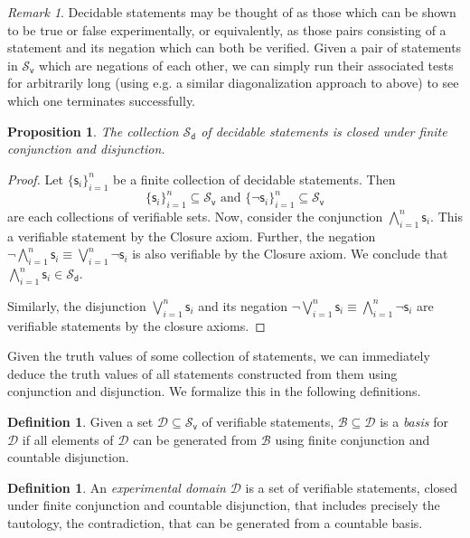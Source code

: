 \documentclass[psamsfonts]{amsart}
\newtheorem{prop}[thm]{Proposition}
\theoremstyle{definition}
\newtheorem{defn}[thm]{Definition}
\theoremstyle{remark}
\newtheorem{rem}[thm]{Remark}
\numberwithin{equation}{section}
\def\vstmtSet{\mathcal{S}_\textsf{v}}
\def\dstmtSet{\mathcal{S}_\textsf{d}}
\def\bigAND{\bigwedge}
\def\bigOR{\bigvee}
\def\NOT{\neg}
\newcommand{\stmt}[1][s] {\mathsf{#1}}
\newcommand{\edomain}[1][D] {\mathcal{#1}}
\newcommand{\basis}[1][B] {\mathcal{#1}} %
\begin{document}
\begin{rem}
Decidable statements may be thought of as those which can be shown to be true or false experimentally, or equivalently, as those pairs consisting of a statement and its negation which can both be verified. Given a pair of statements in $\vstmtSet$ which are negations of each other, we can simply run their associated tests for arbitrarily long (using e.g. a similar diagonalization approach to above) to see which one terminates successfully. 
\end{rem}


\begin{prop}\label{prop_decidable_AND_OR}
The collection $\dstmtSet$ of decidable statements is closed under finite conjunction and disjunction.
\end{prop}
\begin{proof}
	Let $\{\stmt_i\}_{i=1}^{n}$ be a finite collection of decidable statements. Then $$\{\stmt_i\}_{i=1}^{n} \subseteq \vstmtSet\text{ and }\{\NOT\stmt_i\}_{i=1}^{n} \subseteq \vstmtSet$$ are each collections of verifiable sets. Now, consider the conjunction $\bigAND\limits_{i=1}^{n} \stmt_i$. This a verifiable statement by the Closure axiom. Further, the negation $\NOT \bigAND\limits_{i=1}^{n} \stmt_i \equiv \bigOR\limits_{i=1}^{n} \NOT \stmt_i$ is also verifiable by the Closure axiom. We conclude that $\bigAND\limits_{i=1}^{n} \stmt_i\in\dstmtSet$. 
	
	Similarly, the disjunction $\bigOR\limits_{i=1}^{n} \stmt_i$ and its negation $\NOT \bigOR\limits_{i=1}^{n} \stmt_i \equiv \bigAND\limits_{i=1}^{n} \NOT \stmt_i$ are verifiable statements by the closure axioms.
\end{proof}

Given the truth values of some collection of statements, we can immediately deduce the truth values of all statements constructed from them using conjunction and disjunction. We formalize this in the following definitions. 

\begin{defn}
Given a set $\edomain\subseteq\vstmtSet$ of verifiable statements, $\basis\subseteq\edomain$ is a \emph{basis} for $\edomain$ if all elements of $\edomain$ can be generated from $\basis$ using finite conjunction and countable disjunction. 
\end{defn}

\begin{defn}
An \emph{experimental domain} $\edomain$ is a set of verifiable statements, closed under finite conjunction and countable disjunction, that includes precisely the tautology, the contradiction, that can be generated from a countable basis.
\end{defn}
\end{document}
